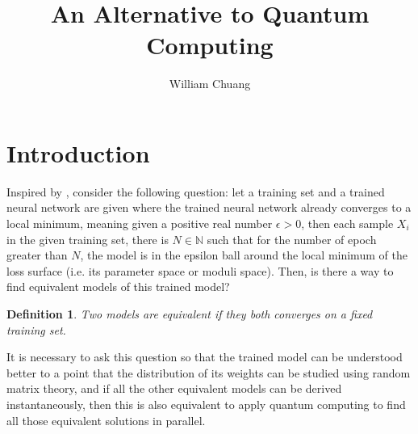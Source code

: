 \documentclass{article}
\theoremstyle{plain}
\theoremstyle{plain} %
\newtheorem{definition}[theorem]{Definition}
\theoremstyle{definition}  %
\theoremstyle{remark}  %
\theoremstyle{plain}
\begin{document}
\title{An Alternative to Quantum Computing}

\author{William Chuang}

\maketitle


\section{Introduction}
Inspired by \cite{yun2017global, blum1988training, judd1990neural}, consider the following question: let a training set and a trained neural network are given where the trained neural network already converges to a local minimum, meaning given a positive real number $\epsilon>0$, then each sample $X_i$ in the given training set, there is $N\in\mathbb{N}$ such that for the number of epoch greater than $N$, the model is in the epsilon ball around the local minimum of the loss surface (i.e. its parameter space or moduli space). Then, is there a way to find equivalent models of this trained model? 

\begin{definition}
\textit{Two models are equivalent} if they both converges on a fixed training set.
\end{definition}

It is necessary to ask this question so that the trained model can be understood better to a point that the distribution of its weights can be studied using random matrix theory, and if all the other equivalent models can be derived instantaneously, then this is also equivalent to apply quantum computing to find all those equivalent solutions in parallel. 
\end{document}
